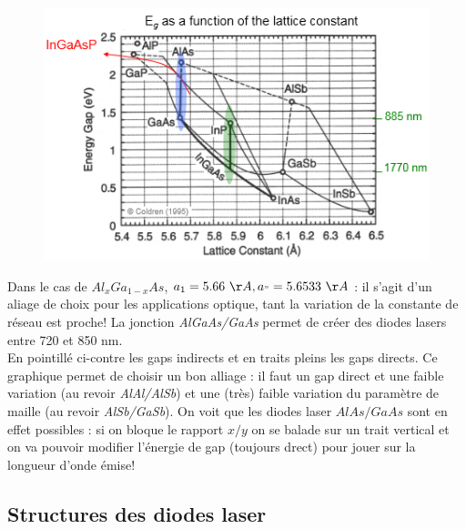 	\begin{figure}
	\vspace{-5mm}
	\includegraphics[scale=0.6]{ch5/image35}
	\end{figure}
		
	Dans le cas de $Al_xGa_{1-x}As$, $a_1 = 5.66\ \AA, a_" = 5.6533\ \AA$ : il s'agit d'un aliage de
	choix pour les applications optique, tant la variation de la constante de réseau est proche! 
	La jonction \textit{AlGaAs/GaAs} permet de créer des diodes lasers entre 720 et 850 nm.\\
	
	En pointillé ci-contre les gaps indirects et en traits pleins les gaps directs. Ce graphique 
	permet de choisir un bon alliage : il faut un gap direct et une faible variation (au revoir 
	\textit{AlAl/AlSb}) et une (très) faible variation du paramètre de maille (au revoir 
	\textit{AlSb/GaSb}). On voit que les diodes laser $AlAs/GaAs$ sont en effet possibles : si on
	bloque le rapport $x/y$ on se balade sur un trait vertical et on va pouvoir modifier l'énergie 
	de gap (toujours drect) pour jouer sur la longueur d'onde émise!

	
	\subsection{Structures des diodes laser}
